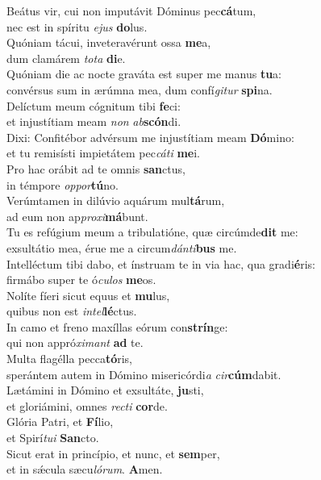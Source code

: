 \evenverse Beátus vir, cui non imputávit Dóminus pec\textbf{cá}tum,~\*\\
\evenverse nec est in spíritu \textit{e}\textit{jus} \textbf{do}lus.\\
\oddverse Quóniam tácui, inveteravérunt ossa \textbf{me}a,~\*\\
\oddverse dum clamárem \textit{to}\textit{ta} \textbf{di}e.\\
\evenverse Quóniam die ac nocte graváta est super me manus \textbf{tu}a:~\*\\
\evenverse convérsus sum in ærúmna mea, dum confí\textit{gi}\textit{tur} \textbf{spi}na.\\
\oddverse Delíctum meum cógnitum tibi \textbf{fe}ci:~\*\\
\oddverse et injustítiam meam \textit{non} \textit{ab}\textbf{scón}di.\\
\evenverse Dixi: Confitébor advérsum me injustítiam meam \textbf{Dó}mino:~\*\\
\evenverse et tu remisísti impietátem pec\textit{cá}\textit{ti} \textbf{me}i.\\
\oddverse Pro hac orábit ad te omnis \textbf{san}ctus,~\*\\
\oddverse in témpore \textit{op}\textit{por}\textbf{tú}no.\\
\evenverse Verúmtamen in dilúvio aquárum mul\textbf{tá}rum,~\*\\
\evenverse ad eum non ap\textit{pro}\textit{xi}\textbf{má}bunt.\\
\oddverse Tu es refúgium meum a tribulatióne, quæ circúmde\textbf{dit} me:~\*\\
\oddverse exsultátio mea, érue me a circum\textit{dán}\textit{ti}\textbf{bus} me.\\
\evenverse Intelléctum tibi dabo, et ínstruam te in via hac, qua gradi\textbf{é}ris:~\*\\
\evenverse firmábo super te ó\textit{cu}\textit{los} \textbf{me}os.\\
\oddverse Nolíte fíeri sicut equus et \textbf{mu}lus,~\*\\
\oddverse quibus non est \textit{in}\textit{tel}\textbf{lé}ctus.\\
\evenverse In camo et freno maxíllas eórum con\textbf{strín}ge:~\*\\
\evenverse qui non appró\textit{xi}\textit{mant} \textbf{ad} te.\\
\oddverse Multa flagélla pecca\textbf{tó}ris,~\*\\
\oddverse sperántem autem in Dómino misericórdi\textit{a} \textit{cir}\textbf{cúm}dabit.\\
\evenverse Lætámini in Dómino et exsultáte, \textbf{ju}sti,~\*\\
\evenverse et gloriámini, omnes \textit{re}\textit{cti} \textbf{cor}de.\\
\oddverse Glória Patri, et \textbf{Fí}lio,~\*\\
\oddverse et Spirí\textit{tu}\textit{i} \textbf{San}cto.\\
\evenverse Sicut erat in princípio, et nunc, et \textbf{sem}per,~\*\\
\evenverse et in sǽcula sæcu\textit{ló}\textit{rum}. \textbf{A}men.\\
